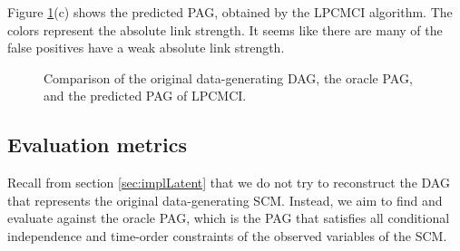 \documentclass[conference]{IEEEtran}
\begin{document}
Figure \ref{fig:predicted}(c) shows the predicted PAG, obtained by the LPCMCI algorithm. The colors represent the absolute link strength. 
It seems like there are many of the false positives have a weak absolute link strength.
\begin{figure}[htbp]
    \centering
        \hspace{5mm}
             \hspace{50mm}
    \caption{Comparison of the original data-generating DAG, the oracle PAG, and the predicted PAG of LPCMCI.}
        \label{fig:predicted}
\end{figure}

\subsection{Evaluation metrics}
\label{sec:eval}
Recall from section \ref{sec:implLatent} that we do not try to reconstruct the DAG that represents the original data-generating SCM. Instead, we aim to find and evaluate against the oracle PAG, which is the PAG that satisfies all conditional independence and time-order constraints of the observed variables of the SCM. 
\end{document}
